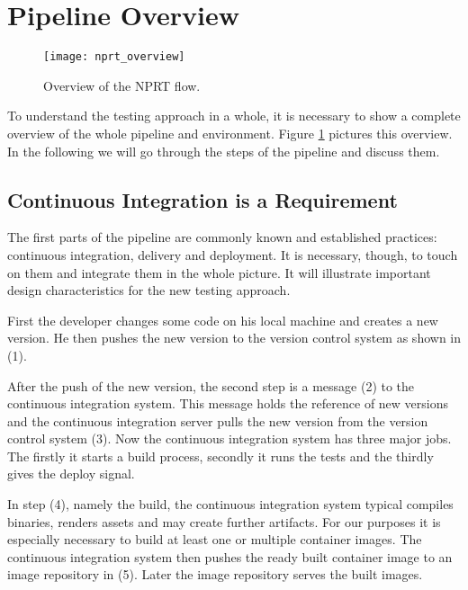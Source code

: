 \section{Pipeline Overview}

\begin{figure}[htbp]
  \centering
  \texttt{[image: nprt\_overview]}
  \caption[nprtflow]{Overview of the NPRT flow.}
  \label{fig:nprt_flow}
\end{figure}

To understand the testing approach in a whole, it is necessary to show a complete overview
of the whole pipeline and environment. Figure \ref{fig:nprt_flow} pictures this
overview. In the following we will go through the steps of the pipeline and discuss them.

\subsection{Continuous Integration is a Requirement}

The first parts of the pipeline are commonly known and established practices: continuous
integration, delivery and deployment. It is necessary, though, to touch on them and
integrate them in the whole picture. It will illustrate important design characteristics
for the new testing approach.

First the developer changes some code on his local machine and creates a new version. He
then pushes the new version to the version control system as shown in (1).

After the push of the new version, the second step is a message (2) to the continuous
integration system. This message holds the reference of new versions and the continuous
integration server pulls the new version from the version control system (3). Now the
continuous integration system has three major jobs. The firstly it starts a build process,
secondly it runs the tests and the thirdly gives the deploy signal.

In step (4), namely the build, the continuous integration system typical compiles
binaries, renders assets and may create further artifacts. For our purposes it is
especially necessary to build at least one or multiple container images. The continuous
integration system then pushes the ready built container image to an image repository in
(5). Later the image repository serves the built images.

